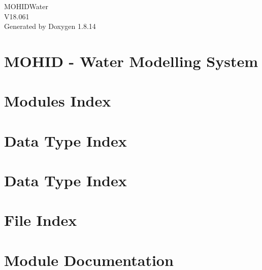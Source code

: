 \documentclass[twoside]{book}
\newcommand{\+}{\discretionary{\mbox{\scriptsize$\hookleftarrow$}}{}{}}
\newcommand{\clearemptydoublepage}{%
  \newpage{\pagestyle{empty}\cleardoublepage}%
}
\begin{document}
\hypersetup{pageanchor=false,
             bookmarksnumbered=true,
             pdfencoding=unicode
            }
\begin{titlepage}
\vspace*{7cm}
\begin{center}%
{\Large M\+O\+H\+I\+D\+Water \\[1ex]\large V18.\+061 }\\
\vspace*{1cm}
{\large Generated by Doxygen 1.8.14}\\
\end{center}
\end{titlepage}
\clearemptydoublepage
{}
\tableofcontents
\clearemptydoublepage
{}
\hypersetup{pageanchor=true}

\chapter{M\+O\+H\+ID -\/ Water Modelling System}
\label{index}\hypertarget{index}{}
\chapter{Modules Index}

\chapter{Data Type Index}

\chapter{Data Type Index}

\chapter{File Index}

\chapter{Module Documentation}



























\end{document}
